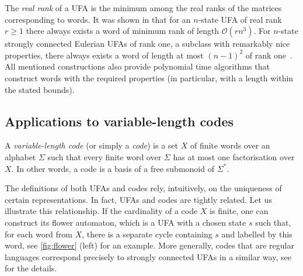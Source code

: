 \documentclass[11pt,a4paper]{amsart}
\newcommand{\OO}{\mathcal{O}}
\theoremstyle{plain}
\theoremstyle{definition}
\theoremstyle{defC}
\theoremstyle{thmC}
\theoremstyle{plain}
\numberwithin{equation}{section}
\begin{document}
The \emph{real rank} of a UFA is the minimum among the real ranks of the matrices corresponding to words. It was shown in \cite{Carpi1988} that for an $n$-state UFA of real rank $r \ge 1$ there always exists a word of minimum rank of length $\OO(rn^3)$.
For $n$-state strongly connected Eulerian UFAs of rank one, a subclass with remarkably nice properties, there always exists a word of length at most $(n - 1)^2$ of rank one~\cite[Corollary~4]{Carpi2009}. All mentioned constructions also provide polynomial time algorithms that construct words with the required properties (in particular, with a length within the stated bounds).

\subsection{Applications to variable-length codes}\label{subs:var-length-codes}

A \emph{variable-length code} (or simply a \emph{code}) is a set $X$ of finite words over an alphabet $\Sigma$ such that every finite word over $\Sigma$ has at most one factorisation over $X$. In other words, a code is a basis of a free submonoid of $\Sigma^*$. 

The definitions of both UFAs and codes rely, intuitively, on the uniqueness of certain representations. In fact, UFAs and codes are tightly related. Let us illustrate this relationship.
If the cardinality of a code $X$ is finite, one can construct its flower automaton, which is a UFA with a chosen state $s$ such that, for each word from $X$, there is a separate cycle containing $s$ and labelled by this word, see \autoref{fig:flower} (left) for an example.
More generally, codes that are regular languages correspond precisely to strongly connected UFAs in a similar way, see \cite[Chapter 4]{Berstel2010} for the details.
\end{document}
